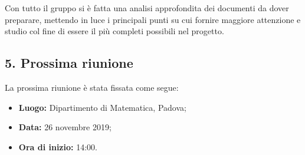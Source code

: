 Con tutto il gruppo si è fatta una analisi approfondita dei documenti da dover preparare, mettendo in luce i principali punti su cui fornire maggiore attenzione e studio col fine di essere il più completi possibili nel progetto.

\subsection*{5. Prossima riunione}

La prossima riunione è stata fissata come segue:
\begin{itemize}
	\item \textbf{Luogo:} Dipartimento di Matematica, Padova;
	\item \textbf{Data:} 26 novembre 2019;
	\item \textbf{Ora di inizio:} 14:00.
\end{itemize}
